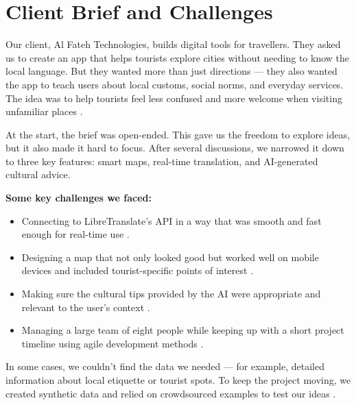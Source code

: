 \section{Client Brief and Challenges}

Our client, Al Fateh Technologies, builds digital tools for travellers. They asked us to create an app that helps tourists explore cities without needing to know the local language. But they wanted more than just directions — they also wanted the app to teach users about local customs, social norms, and everyday services. The idea was to help tourists feel less confused and more welcome when visiting unfamiliar places \cite{culturegap}.

At the start, the brief was open-ended. This gave us the freedom to explore ideas, but it also made it hard to focus. After several discussions, we narrowed it down to three key features: smart maps, real-time translation, and AI-generated cultural advice.

\textbf{Some key challenges we faced:}
\begin{itemize}
  \item Connecting to LibreTranslate’s API in a way that was smooth and fast enough for real-time use \cite{libretranslate}.
  \item Designing a map that not only looked good but worked well on mobile devices and included tourist-specific points of interest \cite{uxTourism}.
  \item Making sure the cultural tips provided by the AI were appropriate and relevant to the user’s context \cite{aiBias}.
  \item Managing a large team of eight people while keeping up with a short project timeline using agile development methods \cite{agileTeams}.
\end{itemize}

In some cases, we couldn’t find the data we needed — for example, detailed information about local etiquette or tourist spots. To keep the project moving, we created synthetic data and relied on crowdsourced examples to test our ideas \cite{crowdsourcing}.
